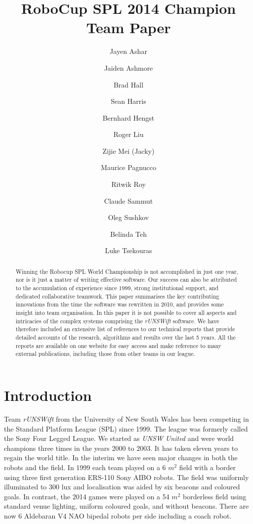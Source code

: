 \documentclass[runningheads,a4paper]{llncs}
\begin{document}
\mainmatter 

\title{RoboCup SPL 2014 Champion Team Paper}

\author{
Jayen Ashar
\and Jaiden Ashmore
\and Brad Hall
\and Sean Harris
\and Bernhard Hengst
\and Roger Liu
\and Zijie Mei (Jacky)
\and Maurice Pagnucco
\and Ritwik Roy
\and Claude Sammut
\and Oleg Sushkov
\and Belinda Teh
\and Luke  Tsekouras
}


\maketitle

\begin{abstract}
Winning the Robocup SPL World Championship is not accomplished in just one year, nor is it just a matter of writing effective software. Our success can also be attributed to the accumulation of experience since 1999, strong institutional support, and dedicated collaborative teamwork. This paper summarises the key contributing innovations from the time the software was rewritten in 2010, and provides some insight into team organisation. In this paper it is not possible to cover all aspects and intricacies of the complex systems comprising the \emph{rUNSWift} software. We have therefore included an extensive list of references to our technical reports that provide detailed accounts of the research, algorithms and results over the last 5 years.  All the reports are available on one website for easy access and make reference to many external publications, including those from other teams in our league. 
\end{abstract}





\section{Introduction}

Team \emph{rUNSWift} from the University of New South Wales has been competing in the Standard Platform League (SPL) since 1999.  The league was formerly called the Sony Four Legged League. We started as \emph{UNSW United} and were world champions three times in the years 2000 to 2003. It has taken eleven years to regain the world title. In the interim we have seen major changes in both the robots and the field. In 1999 each team played on a 6 $m^2$ field with a border using three first generation ERS-110 Sony AIBO robots. The field was uniformly illuminated to 300 lux and localisation was aided by six beacons and coloured goals. In contrast, the 2014 games were played on a 54 $m^2$ borderless field using standard venue lighting, uniform coloured goals, and without beacons. There are now 6 Aldebaran V4 NAO bipedal robots per side including a coach robot.  
\end{document}
